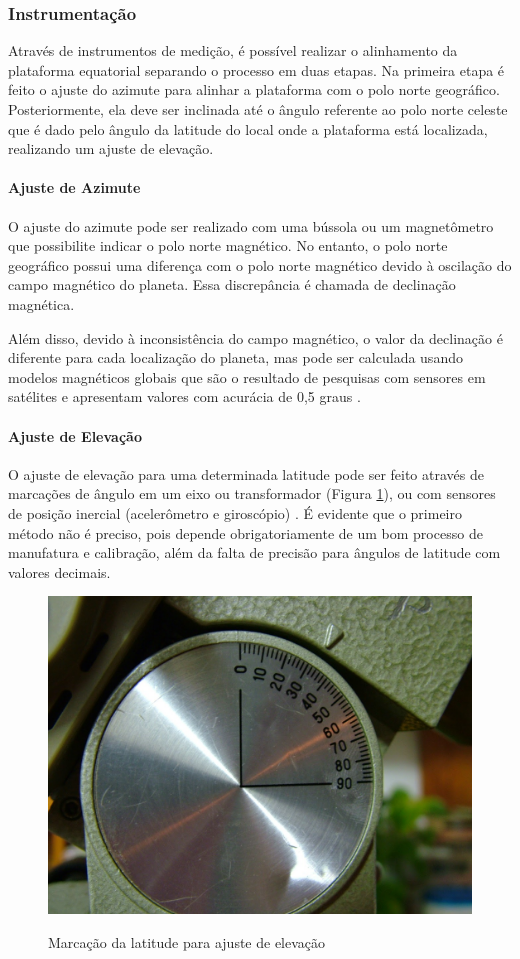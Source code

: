 \subsubsection{Instrumentação}

Através de instrumentos de medição, é possível realizar o alinhamento da plataforma equatorial separando o processo em duas etapas. Na primeira etapa é feito o ajuste do azimute para alinhar a plataforma com o polo norte geográfico. Posteriormente, ela deve ser inclinada até o ângulo referente ao polo norte celeste que é dado pelo ângulo da latitude do local onde a plataforma está localizada, realizando um ajuste de elevação. 

\paragraph{Ajuste de Azimute}
O ajuste do azimute pode ser realizado com uma bússola ou um magnetômetro que possibilite indicar o polo norte magnético. No entanto, o polo norte geográfico possui uma diferença com o polo norte magnético devido à oscilação do campo magnético do planeta. Essa discrepância é chamada de declinação magnética. 

Além disso, devido à inconsistência do campo magnético, o valor da declinação é diferente para cada localização do planeta, mas pode ser calculada usando modelos magnéticos globais que são o resultado de pesquisas com sensores em satélites e apresentam valores com acurácia de 0,5 graus \cite{site:noicDecMag}.

\paragraph{Ajuste de Elevação}
O ajuste de elevação para uma determinada latitude pode ser feito através de marcações de ângulo em um eixo ou transformador (Figura \ref{fig:marcacao_latitude}), ou com sensores de posição inercial (acelerômetro e giroscópio) \cite{site:driftLupus}. É evidente que o primeiro método não é preciso, pois depende obrigatoriamente de um bom processo de manufatura e calibração, além da falta de precisão para ângulos de latitude com valores decimais. 

\begin{figure}[!htb]
	\centering
	\caption{Marcação da latitude para ajuste de elevação}
	\includegraphics[width=0.45\linewidth]{figuras/marcacao_latitude}
	\label{fig:marcacao_latitude}
\end{figure}

